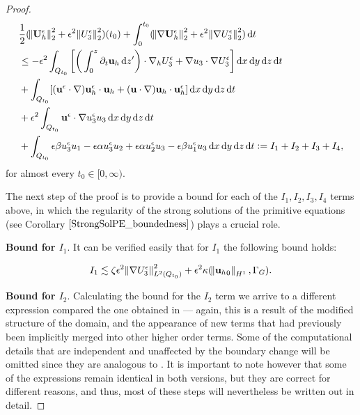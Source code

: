 \documentclass[12pt]{report}
\numberwithin{theorem}{chapter}
\numberwithin{corollary}{chapter}
\numberwithin{lemma}{chapter}
\numberwithin{remark}{chapter}
\numberwithin{definition}{chapter}
\numberwithin{prop}{chapter}
\newcommand*\diff{\mathop{}\!\mathrm{d}}
\begin{document}
\begin{proof}
  \begin{equation} \label{introduce_I_terms}
    \begin{split}
      & \frac{1}{2} (\norm{\mathbf{U}_h^\epsilon}_2^2 + \epsilon^2 \norm{U_3^\epsilon}_2^2) (t_0) + \int_0^{t_0} (\norm{\nabla \mathbf{U}_h^\epsilon}_2^2 + \epsilon^2 \norm{\nabla U_3^\epsilon}_2^2) \diff t  \\
      & \leq - \epsilon^2 \int_{Q_{t_0}} \bigg [ \bigg ( \int_0^z \partial_t \mathbf{u}_h \diff z' \bigg ) \cdot \nabla_h U_3^\epsilon + \nabla u_3 \cdot \nabla U_3^\epsilon \bigg ] \diff x \diff y \diff z \diff t \\
      & + \int_{Q_{t_0}} [(\mathbf{u}^\epsilon \cdot \nabla) \mathbf{u}_h^\epsilon \cdot \mathbf{u}_h + (\mathbf{u} \cdot \nabla )\mathbf{u}_h \cdot \mathbf{u}_h^\epsilon] \diff x \diff y \diff z \diff t \\
      & + \epsilon^2 \int_{Q_{t_0}} \mathbf{u}^\epsilon \cdot \nabla u_3^\epsilon u_3 \diff x \diff y \diff z \diff t \\
      & + \int_{Q_{t_0}}  \epsilon \beta u_3^\epsilon u_1 - \epsilon \alpha u_3^\epsilon u_2 + \epsilon \alpha u_2^\epsilon u_3 - \epsilon \beta u_1^\epsilon u_3 \diff x \diff y \diff z \diff t := I_1 + I_2 + I_3 + I_4, \raisetag{80pt}
    \end{split}
  \end{equation}
%
for almost every $t_0 \in [0, \infty).$
  
  The next step of the proof is to provide a bound for each of the $I_1, I_2, I_3, I_4$ terms above, in which the regularity of the strong solutions of the primitive equations (see Corollary $\ref{StrongSolPE_boundedness}$) plays a crucial role.
  
  \textbf{Bound for $I_1.$} It can be verified easily that for $I_1$ the following bound holds:
  
  $$ I_1 \lesssim \zeta \epsilon^2 \norm{\nabla U_3^\epsilon}^2_{L^2(Q_{t_0})} + \epsilon^2 \kappa (\norm{{\mathbf{u}_h}_0}_{H^1}, \Gamma_G). $$
  
  \textbf{Bound for $I_2.$} Calculating the bound for the $I_2$ term we arrive to a different expression compared the one obtained in \cite{li2019primitive} --- again, this is a result of the modified structure of the domain, and the appearance of new terms that had previously been implicitly merged into other higher order terms. Some of the computational details that are independent and unaffected by the boundary change will be omitted since they are analogous to \cite{li2019primitive}. It is important to note however that some of the expressions remain identical in both versions, but they are correct for different reasons, and thus, most of these steps will nevertheless be written out in detail.
  

\end{proof}
\end{document}
